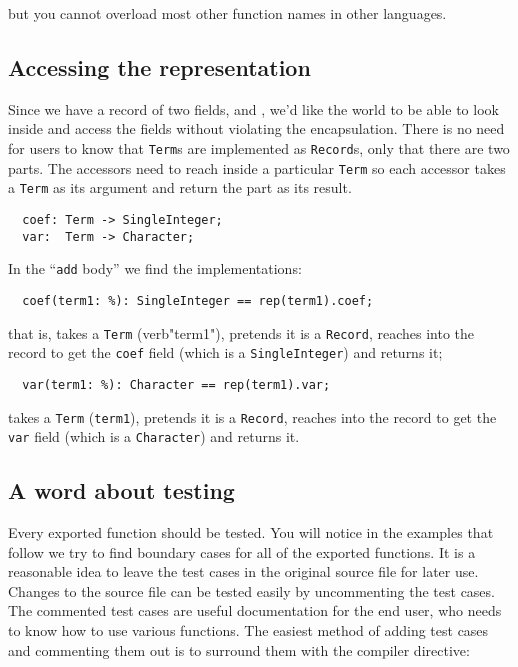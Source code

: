 but you cannot overload most other function names in other languages.

\subsection{Accessing the representation}

Since we have a record of two fields,  and , we'd
like the world to be able to look inside and access the fields
without violating the encapsulation. There is no need for users to
know that \verb"Term"s are implemented as \verb"Record"s, only that there are two
parts.  The accessors need to reach inside a particular \verb"Term" so each
accessor takes a \verb"Term" as its argument and return the part as its
result.

\begin{small}
\begin{verbatim}
  coef: Term -> SingleInteger;
  var:  Term -> Character;
\end{verbatim}
\end{small}

In the ``\verb"add" body'' we find the implementations:

\begin{small}
\begin{verbatim}
  coef(term1: %): SingleInteger == rep(term1).coef;
\end{verbatim}
\end{small}

that is,  takes a \verb"Term" (verb"term1"), pretends it is a \verb"Record", reaches
into the record to get the \verb"coef" field (which is a \verb"SingleInteger") and
returns it;

\begin{small}
\begin{verbatim}
  var(term1: %): Character == rep(term1).var;
\end{verbatim}
\end{small}

 takes a \verb"Term" (\verb"term1"), pretends it is a \verb"Record", reaches
into the record to get the \verb"var" field (which is a \verb"Character") and
returns it.

\subsection{A word about testing}

Every exported function should be tested.
You will notice in the examples that follow we try to find boundary
cases for all of the exported functions. It is a reasonable idea to
leave the test cases in the original source file for later use.
Changes to the source file can be tested easily by uncommenting the
test cases. The commented test cases are useful documentation for
the end user, who needs to know how to use various functions. The easiest
method of adding test cases and commenting them out is to surround them
with the compiler directive:


